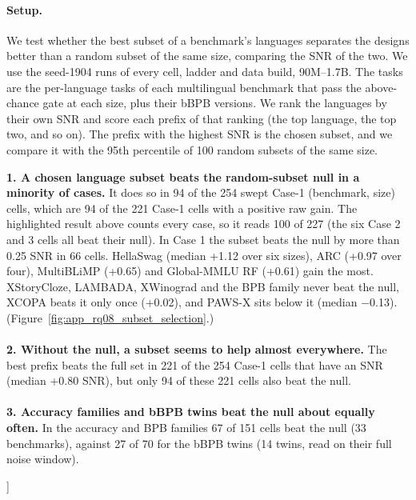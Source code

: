 {\begin{minipage}[t]{0.485\textwidth}
\paragraph{Setup.} We test whether the best subset of a benchmark's languages separates the designs better than a random subset of the same size, comparing the SNR of the two. We use the seed-1904 runs of every cell, ladder and data build, 90M--1.7B. The tasks are the per-language tasks of each multilingual benchmark that pass the above-chance gate at each size, plus their bBPB versions. We rank the languages by their own SNR and score each prefix of that ranking (the top language, the top two, and so on). The prefix with the highest SNR is the chosen subset, and we compare it with the 95th percentile of 100 random subsets of the same size.
\end{minipage}\hfill
\begin{minipage}[t]{0.485\textwidth}
\vspace{0pt}
\begin{rqfinding}
\textbf{1. A chosen language subset beats the random-subset null in a minority of cases.} It does so in 94 of the 254 swept Case-1 (benchmark, size) cells, which are 94 of the 221 Case-1 cells with a positive raw gain. The highlighted result above counts every case, so it reads 100 of 227 (the six Case 2 and 3 cells all beat their null). In Case 1 the subset beats the null by more than 0.25 SNR in 66 cells. HellaSwag (median +1.12 over six sizes), ARC (+0.97 over four), MultiBLiMP (+0.65) and Global-MMLU RF (+0.61) gain the most. XStoryCloze, LAMBADA, XWinograd and the BPB family never beat the null, XCOPA beats it only once (+0.02), and PAWS-X sits below it (median $-$0.13). (Figure~\ref{fig:app_rq08_subset_selection}.)
\\
\\
\textbf{2. Without the null, a subset seems to help almost everywhere.} The best prefix beats the full set in 221 of the 254 Case-1 cells that have an SNR (median +0.80 SNR), but only 94 of these 221 cells also beat the null.
\\
\\
\textbf{3. Accuracy families and bBPB twins beat the null about equally often.} In the accuracy and BPB families 67 of 151 cells beat the null (33 benchmarks), against 27 of 70 for the bBPB twins (14 twins, read on their full noise window).
\end{rqfinding}
\end{minipage}
\vspace{\baselineskip}
}]

